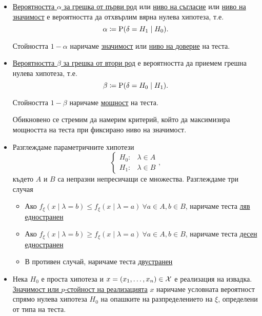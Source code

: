 \documentclass[numbers=endperiod, DIV=15, bibliography=totocnumbered]{scrartcl}
\begin{document}
\begin{definition}[Хипотези]
\begin{itemize}
    \item \uline{Вероятността $\alpha$ за грешка от първи род} или \uline{ниво на съгласие} или \uline{ниво на значимост} е вероятността да отхвърлим вярна нулева хипотеза, т.е.
    \begin{displaymath}
      \alpha \coloneqq \operatorname{P}(\delta = H_1 \mid H_0).
    \end{displaymath}

    Стойността $1 - \alpha$ наричаме \uline{значимост} или \uline{ниво на доверие} на теста.

    \item \uline{Вероятността $\beta$ за грешка от втори род} е вероятността да приемем грешна нулева хипотеза, т.е.
    \begin{displaymath}
      \beta \coloneqq \operatorname{P}(\delta = H_0 \mid H_1).
    \end{displaymath}

    Стойността $1 - \beta$ наричаме \uline{мощност} на теста.

    Обикновено се стремим да намерим критерий, който да максимизира мощността на теста при фиксирано ниво на значимост.

    \item Разглеждаме параметричните хипотези
    \begin{displaymath}
      \begin{cases}
        H_0: &\lambda \in A \\
        H_1: &\lambda \in B
      \end{cases},
    \end{displaymath}
    където $A$ и $B$ са непразни непресичащи се множества. Разглеждаме три случая
    \begin{itemize}
      \item Ако $f_\xi(x \mid \lambda = b) \leq f_\xi(x \mid \lambda = a)~\forall a \in A, b \in B$, наричаме теста \uline{ляв едностранен}
      \item Ако $f_\xi(x \mid \lambda = b) \geq f_\xi(x \mid \lambda = a)~\forall a \in A, b \in B$, наричаме теста \uline{десен едностранен}
      \item В противен случай, наричаме теста \uline{двустранен}
    \end{itemize}

    \item Нека $H_0$ е проста хипотеза и $x = (x_1, \ldots, x_n) \in \mathcal{X}$ е реализация на извадка. \uline{Значимост или $p$-стойност на реализацията} $x$ наричаме условната вероятност спрямо нулева хипотеза $H_0$ на опашките на разпределението на $\xi$, определени от типа на теста.


\end{itemize}
\end{definition}
\end{document}
